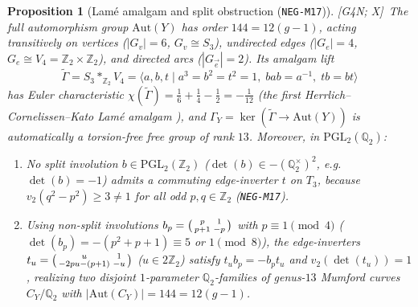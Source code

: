 \documentclass[11pt]{amsart}
\numberwithin{equation}{section}
\theoremstyle{plain}
\newtheorem{proposition}[theorem]{Proposition}
\theoremstyle{definition}\newtheorem{definition}[theorem]{Definition}
\theoremstyle{remark}\newtheorem{remark}[theorem]{Remark}
\newcommand{\Q}{\mathbb{Q}}
\newcommand{\Z}{\mathbb{Z}}
\newcommand{\PGL}{\mathrm{PGL}}
\newcommand{\Aut}{\mathrm{Aut}}
\newcommand{\ctag}[1]{\textup{\textsf{\scriptsize[#1]}}}
\begin{document}
\begin{proposition}[Lam\'e amalgam and split obstruction (\texttt{NEG-M17})]\label{prop:lame_amalgam}
\ctag{G4N; X}\ The full automorphism group $\Aut(Y)$ has order $144 = 12(g-1)$, acting transitively on vertices ($|G_v|=6$, $G_v\cong S_3$), undirected edges ($|G_e|=4$, $G_e\cong V_4=\Z_2\times\Z_2$), and directed arcs ($|G_{\vec{e}}|=2$). Its amalgam lift
\begin{equation}\label{eq:lame_amalgam}
\tilde{\Gamma} = S_3 *_{\Z_2} V_4 = \bigl\langle a,b,t \mid a^3=b^2=t^2=1,\; bab=a^{-1},\; tb=bt \bigr\rangle
\end{equation}
has Euler characteristic $\chi(\tilde{\Gamma})=\tfrac16+\tfrac14-\tfrac12=-\tfrac{1}{12}$ (the first Herrlich--Cornelissen--Kato Lam\'e amalgam \cite{herrlich1980,ck2002,ck2004}), and $\Gamma_Y = \ker(\tilde{\Gamma}\to\Aut(Y))$ is automatically a torsion-free free group of rank $13$. Moreover, in $\PGL_2(\Q_2)$:
\begin{enumerate}[label=(\alph*),nosep]
\item No split involution $b\in\PGL_2(\Z_2)$ ($\det(b)\in -(\Q_2^\times)^2$, e.g.\ $\det(b)=-1$) admits a commuting edge-inverter $t$ on $T_3$, because $v_2(q^2-p^2)\ge 3\neq 1$ for all odd $p,q\in\Z_2$ (\texttt{NEG-M17}).
\item Using non-split involutions $b_p=\begin{psmallmatrix}p & 1 \\ p+1 & -p\end{psmallmatrix}$ with $p\equiv 1\pmod 4$ ($\det(b_p)=-(p^2+p+1)\equiv 5$ or $1\pmod 8$), the edge-inverters $t_u=\begin{psmallmatrix}u & 1 \\ -2pu-(p+1) & -u\end{psmallmatrix}$ ($u\in 2\Z_2$) satisfy $t_u b_p = -b_p t_u$ and $v_2(\det(t_u))=1$, realizing two disjoint $1$-parameter $\Q_2$-families of genus-$13$ Mumford curves $C_Y/\Q_2$ with $|\Aut(C_Y)|=144=12(g-1)$.
\end{enumerate}
\end{proposition}
\end{document}
